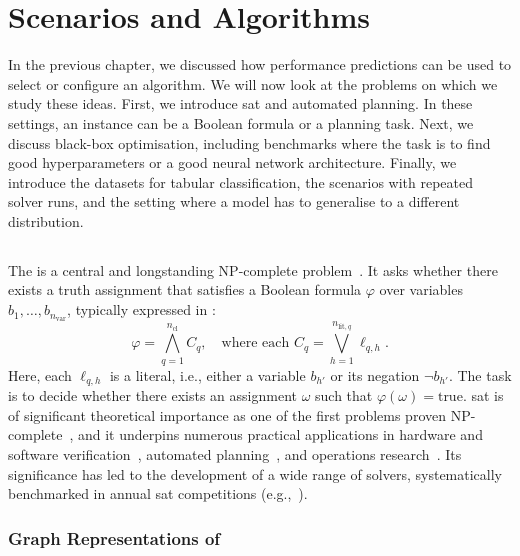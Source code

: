 \chapter{Scenarios and Algorithms}
\label{ch:ch03:scenarios}

In the previous chapter, we discussed how performance predictions can be used to select or configure an algorithm. We will now look at the problems on which we study these ideas. First, we introduce \gls{sat} and automated planning. In these settings, an instance can be a Boolean formula or a planning task. Next, we discuss black-box optimisation, including benchmarks where the task is to find good hyperparameters or a good neural network architecture. Finally, we introduce the datasets for tabular classification, the scenarios with repeated solver runs, and the setting where a model has to generalise to a different distribution.

\section{}

The  is a central and longstanding \textsf{NP}-complete problem~\citep{Karp72,BieEtAl21b}. It asks whether there exists a truth assignment that satisfies a Boolean formula $\varphi$ over variables $b_1,\ldots,b_{n_{\mathrm{var}}}$, typically expressed in :
\begin{equation*}
	\varphi = \bigwedge_{q=1}^{n_{\mathrm{cl}}} C_q, \quad \text{where each } C_q = \bigvee_{h=1}^{n_{\mathrm{lit},q}} \ell_{q, h}.
\end{equation*}
Here, each $\ell_{q,h}$ is a literal, i.e., either a variable $b_{h\prime}$ or its negation $\lnot b_{h\prime}$. The task is to decide whether there exists an assignment $\omega$ such that $\varphi(\omega) = \text{true}$. \Gls{sat} is of significant theoretical importance as one of the first problems proven \textsf{NP}-complete~\citep{Cook71}, and it underpins numerous practical applications in hardware and software verification~\citep{BieEtAl09}, automated planning~\citep{KauSel96}, and operations research~\citep{GomEtAl08}. Its significance has led to the development of a wide range of solvers, systematically benchmarked in annual \gls{sat} competitions (e.g.,~\citep{FroEtAl21,BalEtAl17,HeuEtAl19}).

\subsection{Graph Representations of }
\label{sec:ch03:sat-graphs}

